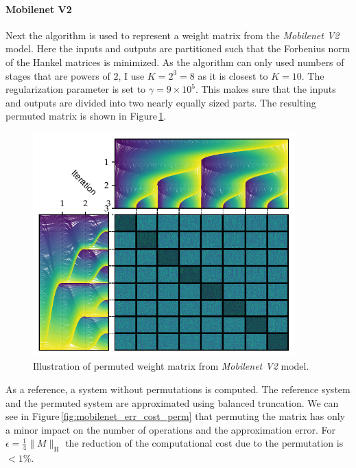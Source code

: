 \documentclass[doctype=mastersthesis,BCOR=15mm,biblatex]{ldvbook}%
\begin{document}
\paragraph{Mobilenet V2}
Next the algorithm is used to represent a weight matrix from the \emph{Mobilenet V2} model.
Here the inputs and outputs are partitioned such that the Forbenius norm of the Hankel matrices is minimized.
As the algorithm can only used numbers of stages that are powers of $2$, I use $K=2^3=8$ as it is closest to $K=10$.
The regularization parameter is set to $\gamma=9\times10^5$.
This makes sure that the inputs and outputs are divided into two nearly equally sized parts.
The resulting permuted matrix is shown in Figure\,\ref{fig:mobilenet_permutation}.
\begin{figure}[!htb]
	\centering
	\includegraphics[width=0.9\textwidth]{Plots/Mobilenet_permute.pdf}
	\caption{Illustration of permuted weight matrix from \emph{Mobilenet V2} model.
	}
	\label{fig:mobilenet_permutation}
\end{figure}
As a  reference, a system without permutations is computed.
The reference system and the permuted system are approximated using balanced truncation.
We can see in Figure\,\ref{fig:mobilenet_err_cost_perm} that permuting the matrix has only a minor impact on the number of operations and the approximation error.
For $\epsilon = \frac{1}{4}\|M\|_\text{H}$ the reduction of the computational cost due to the permutation is $<1\%$.
\end{document}
